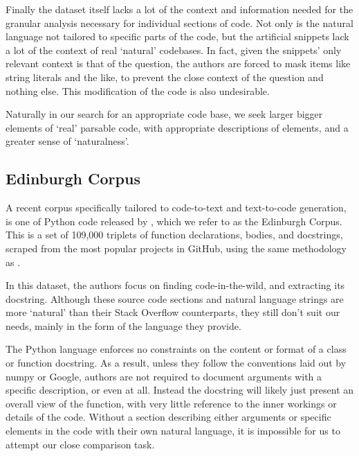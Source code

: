 Finally the dataset itself lacks a lot of the context and information needed for the granular analysis necessary for individual sections of code. Not only is the natural language not tailored to specific parts of the code, but the artificial snippets lack a lot of the context of real `natural' codebases. In fact, given the snippets' only relevant context is that of the question, the authors are forced to mask items like string literals and the like, to prevent the close context of the question and nothing else. This modification of the code is also undesirable.

Naturally in our search for an appropriate code base, we seek larger bigger elements of `real' parsable code, with appropriate descriptions of elements, and a greater sense of `naturalness'.

\subsection{Edinburgh Corpus}

A recent corpus specifically tailored to code-to-text and text-to-code generation, is one of Python code released by \citet{barone_parallel_2017}, which we refer to as the Edinburgh Corpus. 
This is a set of 109,000 triplets of function declarations, bodies, and docstrings, scraped from the most popular projects in GitHub, using the same methodology as \citet{bhoopchand_learning_2016}. 

In this dataset, the authors focus on finding code-in-the-wild, and extracting its docstring.
Although these source code sections and natural language strings are more `natural' than their Stack Overflow counterparts, they still don't suit our needs, mainly in the form of the language they provide. 

The Python language enforces no constraints on the content or format of a class or function docstring.
As a result, unless they follow the conventions laid out by numpy or Google, authors are not required to document arguments with a specific description, or even at all.
Instead the docstring will likely just present an overall view of the function, with very little reference to the inner workings or details of the code. 
Without a section describing either arguments or specific elements in the code with their own natural language, it is impossible for us to attempt our close comparison task.



